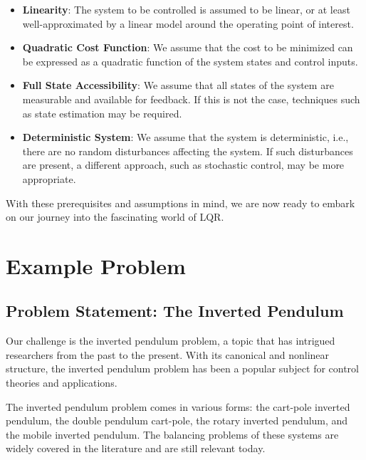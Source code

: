 \documentclass[11pt,twocolumn,twoside,lineno]{pnas-new}
\begin{document}
\begin{itemize}
       \item \textbf{Linearity}: The system to be controlled is assumed to be linear, or at least well-approximated by a linear model around the operating point of interest.
       \item \textbf{Quadratic Cost Function}: We assume that the cost to be minimized can be expressed as a quadratic function of the system states and control inputs.
       \item \textbf{Full State Accessibility}: We assume that all states of the system are measurable and available for feedback. If this is not the case, techniques such as state estimation may be required.
       \item \textbf{Deterministic System}: We assume that the system is deterministic, i.e., there are no random disturbances affecting the system. If such disturbances are present, a different approach, such as stochastic control, may be more appropriate.
\end{itemize}

With these prerequisites and assumptions in mind, we are now ready to embark on our journey into the fascinating world of LQR.


\section{Example Problem}
\subsection{Problem Statement: The Inverted Pendulum}
Our challenge is the inverted pendulum problem, a topic that has intrigued researchers from the past to the present. With its canonical and nonlinear structure, the inverted pendulum problem has been a popular subject for control theories and applications.

The inverted pendulum problem comes in various forms: the cart-pole inverted pendulum, the double pendulum cart-pole, the rotary inverted pendulum, and the mobile inverted pendulum. The balancing problems of these systems are widely covered in the literature and are still relevant today.
\end{document}
